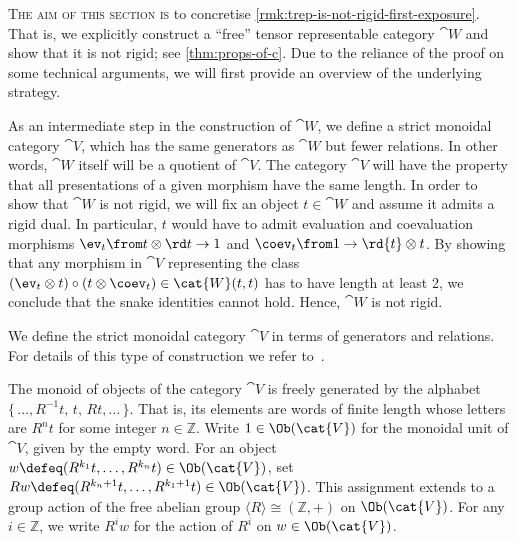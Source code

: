 \textsc{The aim of this section is} to concretise \cref{rmk:trep-is-not-rigid-first-exposure}.
That is, we explicitly construct a ``free'' tensor representable category \(\cat{W}\) and show that it is not rigid;
see \cref{thm:props-of-c}.
Due to the reliance of the proof on some technical arguments,
we will first provide an overview of the underlying strategy.

As an intermediate step in the construction of \(\cat{W}\), we define a strict monoidal category \(\cat{V}\), which has the same generators as \(\cat{W}\) but fewer relations.
In other words, \(\cat{W}\) itself will be a quotient of \(\cat{V}\).
The category \(\cat{V}\) will have the property that all presentations of a given morphism have the same length.
In order to show that \(\cat{W}\) is not rigid, we will fix an object \(t \in\cat{W}\) and assume it admits a rigid dual.
In particular, \(t\) would have to admit evaluation and coevaluation morphisms \(\ev_t \from t \otimes \rd t \to 1\) and \( \coev_t \from  1 \to \rd{t} \otimes t\).
By showing that any morphism in \(\cat{V}\) representing the class
\((\ev_t \otimes t) \circ (t \otimes \coev_{t}) \in \cat{W}(t,t)\) has to have length at least 2, we conclude that the snake identities cannot hold.
Hence, \(\cat{W}\) is not rigid.

We define the strict monoidal category \(\cat{V}\) in terms of generators and relations.
For details of this type of construction we refer to~\cite[Chapter~\textsc{xii}]{Kassel1998}.

The monoid of objects of the category \(\cat{V}\) is freely generated by the alphabet
\(\{\, \dots, R^{-1}t,\, t,\, Rt, \dots \,\}\).
That is, its elements are words of finite length whose letters are \(R^n t\) for some integer \(n \in\mathbb{Z}\).
Write \(1\in\Ob(\cat{V})\) for the monoidal unit of \(\cat{V}\), given by the empty word.
For an object \(w \defeq (R^{k_1}t, \dots, R^{k_n}t) \in \Ob(\cat{V})\), set \(Rw \defeq (R^{k_n+1}t, \dots, R^{k_1+1}t)\in \Ob(\cat{V})\).
This assignment extends to a group action of the free abelian group \(\langle R \rangle \cong (\mathbb{Z},+)\) on \(\Ob(\cat{V})\).
For any \(i \in\mathbb{Z}\), we write \(R^{i}w\) for the action of \(R^{i}\) on \(w \in \Ob(\cat{V})\).

